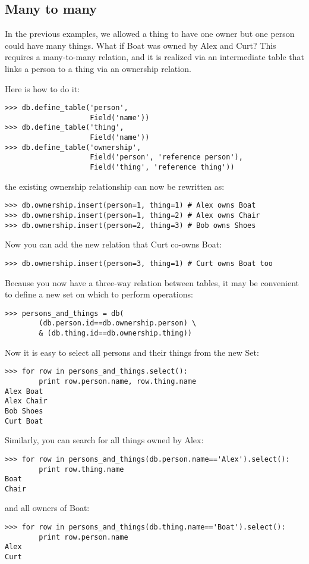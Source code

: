 \documentclass[justified,sixbynine,notoc]{tufte-book}
\def\inxx#1{\index{#1}}
\begin{document}
\begin{fullwidth}
\goodbreak\section{Many to many}

\inxx{many-to-many}
In the previous examples, we allowed a thing to have one owner but one person could have many things. What if Boat was owned by Alex and Curt? This requires a many-to-many relation, and it is realized via an intermediate table that links a person to a thing via an ownership relation.

Here is how to do it:
\begin{lstlisting}
>>> db.define_table('person',
                    Field('name'))
>>> db.define_table('thing',
                    Field('name'))
>>> db.define_table('ownership',
                    Field('person', 'reference person'),
                    Field('thing', 'reference thing'))
\end{lstlisting}
\noindent the existing ownership relationship can now be rewritten as:
\begin{lstlisting}
>>> db.ownership.insert(person=1, thing=1) # Alex owns Boat
>>> db.ownership.insert(person=1, thing=2) # Alex owns Chair
>>> db.ownership.insert(person=2, thing=3) # Bob owns Shoes

\end{lstlisting}

Now you can add the new relation that Curt co-owns Boat:
\begin{lstlisting}
>>> db.ownership.insert(person=3, thing=1) # Curt owns Boat too

\end{lstlisting}

Because you now have a three-way relation between tables, it may be convenient to define a new set on which to perform operations:
\begin{lstlisting}
>>> persons_and_things = db(
        (db.person.id==db.ownership.person) \
        & (db.thing.id==db.ownership.thing))
\end{lstlisting}

Now it is easy to select all persons and their things from the new Set:
\begin{lstlisting}
>>> for row in persons_and_things.select():
        print row.person.name, row.thing.name
Alex Boat
Alex Chair
Bob Shoes
Curt Boat
\end{lstlisting}

Similarly, you can search for all things owned by Alex:
\begin{lstlisting}
>>> for row in persons_and_things(db.person.name=='Alex').select():
        print row.thing.name
Boat
Chair
\end{lstlisting}
\noindent and all owners of Boat:
\begin{lstlisting}
>>> for row in persons_and_things(db.thing.name=='Boat').select():
        print row.person.name
Alex
Curt
\end{lstlisting}


\end{fullwidth}
\end{document}
